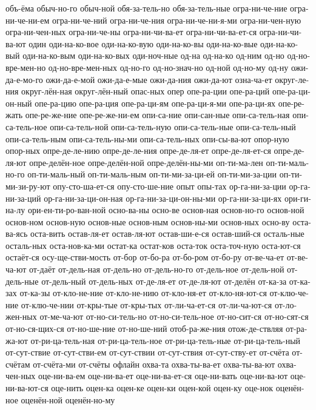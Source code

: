 {объ-ёма
обыч-но-го
обыч-ной
обя-за-тель-но
обя-за-тель-ные
огра-ни-че-ние
огра-ни-че-ни-ем
огра-ни-че-ний
огра-ни-че-ния
огра-ни-че-ни-я-ми
огра-ни-чен-ную
огра-ни-чен-ных
огра-ни-че-ны
огра-ни-чи-ва-ет
огра-ни-чи-ва-ет-ся
огра-ни-чи-ва-ют
один
оди-на-ко-вое
оди-на-ко-вую
оди-на-ко-вы
оди-на-ко-вые
оди-на-ко-вый
оди-на-ко-вым
оди-на-ко-вых
оди-ноч-ные
од-на
од-на-ко
од-ним
од-но
од-но-вре-мен-но
од-но-вре-мен-ных
од-но-го
од-но-знач-но
од-ной
од-но-му
од-ну
ожи-да-е-мо-го
ожи-да-е-мой
ожи-да-е-мые
ожи-да-ния
ожи-да-ют
озна-ча-ет
округ-ле-ния
округ-лён-ная
округ-лён-ный
опас-ных
опер
опе-ра-ции
опе-ра-ций
опе-ра-ци-он-ный
опе-ра-цию
опе-ра-ция
опе-ра-ци-ям
опе-ра-ци-я-ми
опе-ра-ци-ях
опе-ре-жать
опе-ре-же-ние
опе-ре-же-ни-ем
опи-са-ние
опи-сан-ные
опи-са-тель-ная
опи-са-тель-ное
опи-са-тель-ной
опи-са-тель-ную
опи-са-тель-ные
опи-са-тель-ный
опи-са-тель-ным
опи-са-тель-ны-ми
опи-са-тель-ных
опи-сы-ва-ют
опор-ную
опор-ных
опре-де-ле-нию
опре-де-ле-ния
опре-де-ля-ет
опре-де-ля-ет-ся
опре-де-ля-ют
опре-делён-ное
опре-делён-ной
опре-делён-ны-ми
оп-ти-ма-лен
оп-ти-маль-но-го
оп-ти-маль-ный
оп-ти-маль-ным
оп-ти-ми-за-ци-ей
оп-ти-ми-за-ции
оп-ти-ми-зи-ру-ют
опу-сто-ша-ет-ся
опу-сто-ше-ние
опыт
опы-тах
ор-га-ни-за-ции
ор-га-ни-за-ций
ор-га-ни-за-ци-он-ная
ор-га-ни-за-ци-он-ны-ми
ор-га-ни-за-ци-ях
ори-ги-на-лу
ори-ен-ти-ро-ван-ной
осно-ва-ны
осно-ве
основ-ная
основ-но-го
основ-ной
основ-ном
основ-ную
основ-ные
основ-ным
основ-ны-ми
основ-ных
осно-ву
оста-ва-ясь
оста-вить
остав-ля-ет
остав-ля-ют
остав-ши-е-ся
остав-ший-ся
осталь-ные
осталь-ных
оста-нов-ка-ми
остат-ка
остат-ков
оста-ток
оста-точ-ную
оста-ют-ся
остаёт-ся
осу-ще-стви-мость
от-бор
от-бо-ра
от-бо-ром
от-бо-ру
от-ве-ча-ет
от-ве-ча-ют
от-даёт
от-дель-ная
от-дель-но
от-дель-но-го
от-дель-ное
от-дель-ной
от-дель-ные
от-дель-ный
от-дель-ных
от-де-ля-ет
от-де-ля-ют
от-делён
от-ка-за
от-ка-зах
от-ка-зы
от-кло-не-ние
от-кло-не-нию
от-кло-ня-ет
от-кло-ня-ют-ся
от-клю-че-ние
от-клю-че-нии
от-кры-тые
от-кры-тых
от-ли-ча-ет-ся
от-ли-ча-ют-ся
от-ло-жен-ных
от-ме-ча-ют
от-но-си-тель-но
от-но-си-тель-ное
от-но-сит-ся
от-но-сят-ся
от-но-ся-щих-ся
от-но-ше-ние
от-но-ше-ний
отоб-ра-же-ния
отож-де-ствляя
от-ра-жа-ют
от-ри-ца-тель-ная
от-ри-ца-тель-ное
от-ри-ца-тель-ные
от-ри-ца-тель-ный
от-сут-ствие
от-сут-стви-ем
от-сут-ствии
от-сут-ствия
от-сут-ству-ет
от-счёта
от-счётам
от-счёта-ми
от-счёты
офлайн
охва-та
охва-ты-ва-ет
охва-ты-ва-ют
охва-чен-ных
оце-ни-ва-ем
оце-ни-ва-ет
оце-ни-ва-ет-ся
оце-ни-вать
оце-ни-ва-ют
оце-ни-ва-ют-ся
оце-нить
оцен-ка
оцен-ке
оцен-ки
оцен-кой
оцен-ку
оце-нок
оценён-ное
оценён-ной
оценён-но-му
}
